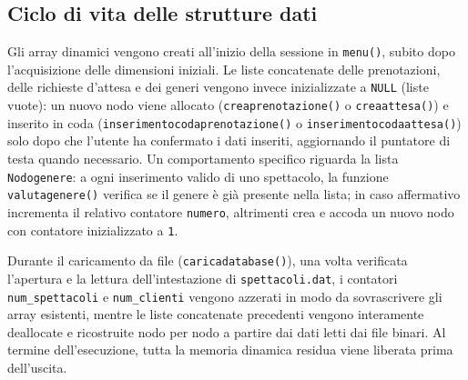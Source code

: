 \documentclass[11pt,a4paper,oneside,openany]{book}
\begin{document}
\subsection{Ciclo di vita delle strutture dati}
Gli array dinamici vengono creati all'inizio della sessione in \texttt{menu()}, subito dopo l'acquisizione delle dimensioni iniziali. Le liste concatenate delle prenotazioni, delle richieste d'attesa e dei generi vengono invece inizializzate a \texttt{NULL} (liste vuote): un nuovo nodo viene allocato (\texttt{creaprenotazione()} o \texttt{creaattesa()}) e inserito in coda (\texttt{inserimentocodaprenotazione()} o \texttt{inserimentocodaattesa()}) solo dopo che l'utente ha confermato i dati inseriti, aggiornando il puntatore di testa quando necessario. Un comportamento specifico riguarda la lista \texttt{Nodogenere}: a ogni inserimento valido di uno spettacolo, la funzione \texttt{valutagenere()} verifica se il genere è già presente nella lista; in caso affermativo incrementa il relativo contatore \texttt{numero}, altrimenti crea e accoda un nuovo nodo con contatore inizializzato a \texttt{1}.

Durante il caricamento da file (\texttt{caricadatabase()}), una volta verificata l'apertura e la lettura dell'intestazione di \texttt{spettacoli.dat}, i contatori \texttt{num\_spettacoli} e \texttt{num\_clienti} vengono azzerati in modo da sovrascrivere gli array esistenti, mentre le liste concatenate precedenti vengono interamente deallocate e ricostruite nodo per nodo a partire dai dati letti dai file binari. Al termine dell'esecuzione, tutta la memoria dinamica residua viene liberata prima dell'uscita.
\end{document}
